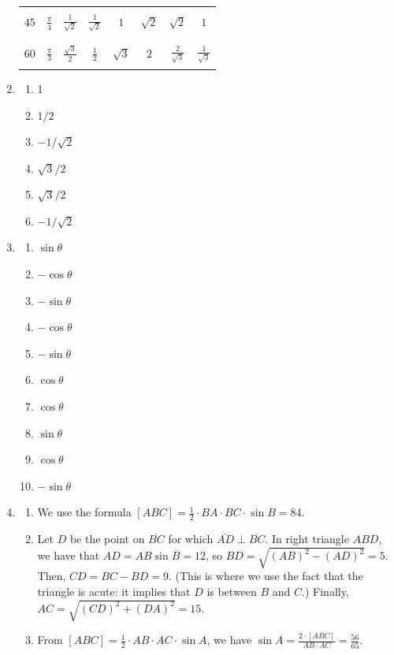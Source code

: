 \begin{enumerate}
\begin{table}[H]
\begin{tabular}{c|c||c|c|c|c|c|c}
& & & & & & & \\ \hline
& & & & & & & \\
$45$ & $\frac{\pi}{4}$ & $\frac{1}{\sqrt{2}}$ & $\frac{1}{\sqrt{2}}$ & $1$ & $\sqrt{2}$ & $\sqrt{2}$ & $1$ \\
& & & & & & & \\ \hline
& & & & & & & \\
$60$ & $\frac{\pi}{3}$ & $\frac{\sqrt{3}}{2}$ & $\frac{1}{2}$ & $\sqrt{3}$ & $2$ & $\frac{2}{\sqrt{3}}$ & $\frac{1}{\sqrt{3}}$ \\
& & & & & & & 
\end{tabular}
\end{table}
\item \begin{enumerate}
\item 1
\item $1/2$
\item $-1/\sqrt{2}$
\item $\sqrt{3}/2$
\item $\sqrt{3}/2$
\item $-1/\sqrt{2}$
\end{enumerate}
\item \begin{enumerate}
\item $\sin\theta$
\item $-\cos\theta$
\item $-\sin\theta$
\item $-\cos\theta$
\item $-\sin\theta$
\item $\cos\theta$
\item $\cos\theta$
\item $\sin\theta$
\item $\cos\theta$
\item $-\sin\theta$
\end{enumerate}
\item \begin{enumerate}
\item We use the formula $[ABC] = \frac{1}{2}\cdot BA\cdot BC\cdot\sin B = 84$.
\item Let $D$ be the point on $\overline{BC}$ for which $\overline{AD}\perp\overline{BC}$. In right triangle $ABD$, we have that $AD = AB\sin B = 12$, so $BD = \sqrt{(AB)^2 - (AD)^2} = 5$. Then, $CD = BC - BD = 9$. (This is where we use the fact that the triangle is acute: it implies that $D$ is between $B$ and $C$.) Finally, $AC = \sqrt{(CD)^2 + (DA)^2} = 15$.
\item From $[ABC] = \frac{1}{2}\cdot AB\cdot AC\cdot\sin A$, we have $\sin A = \frac{2\cdot [ABC]}{AB\cdot AC} = \frac{56}{65}$.

\end{enumerate}
\end{enumerate}
